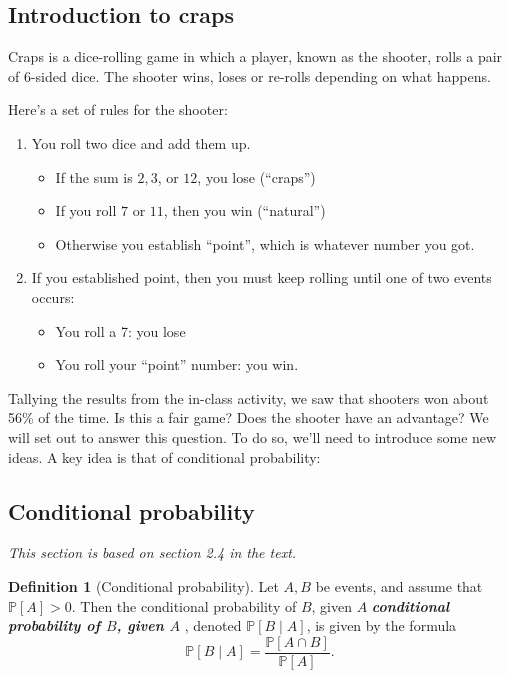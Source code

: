 \documentclass[10pt]{article}
\theoremstyle{definition}
\newtheorem{definition}[theorem]{Definition}
\newcommand{\1}[1]{\textbf{1}_{\left[#1\right]}} %
\def\P{\mathbb{P}} %
\DeclareRobustCommand{\demph}[1]{%
  \ifmmode
  {\color{Blue}#1}%
  \else
  {\color{Blue}\bfseries\slshape #1}%
  \fi
}
\begin{document}
\subsection{Introduction to craps}
Craps is a dice-rolling game in which a player, known as the shooter, rolls a
pair of 6-sided dice. The shooter wins, loses or re-rolls depending on what
happens.

Here's a set of rules for the shooter:
\begin{enumerate} 
  \item You roll two dice and add them up.
  \begin{itemize}
    \item If the sum is $2,3$, or $12$, you lose (``craps'')
    \item If you roll $7$ or $11$, then you win  (``natural'')
    \item Otherwise you establish ``point'', which is whatever number you got.
  \end{itemize}
  \item If you established point, then you must keep rolling until one of two events occurs:
  \begin{itemize}
    \item You roll a 7: you lose
    \item You roll your ``point'' number: you win.
  \end{itemize}
\end{enumerate}


Tallying the results from the in-class activity, we saw that shooters won
about 56\% of the time. Is this a fair game? Does the shooter have an
advantage? We will set out to answer this question. To do so, we'll need to
introduce some new ideas. A key idea is that of conditional probability:


\subsection{Conditional probability}
\textit{This section is based on section 2.4 in the text.}

\begin{definition}[Conditional probability]
  \label{def:conditional-probability}
  Let $A,B$ be events, and assume that $\P\left[A\right]>0$. Then the
  \demph{conditional probability of $B$, given $A$}, denoted
  $\P\left[B\mid A \right]$, is given by the formula
  \begin{equation*}
    \P\left[B\mid A \right] = \frac{\P\left[A\cap B \right]}{\P\left[A \right]}.
  \end{equation*}
\end{definition}
\end{document}
